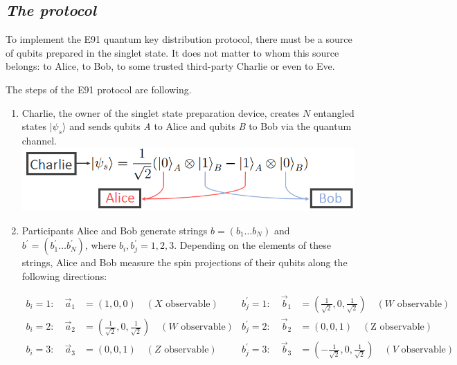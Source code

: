 \documentclass[11pt]{article}
\makeatletter
\def\maxwidth{\ifdim\Gin@nat@width>\linewidth\linewidth
    \else\Gin@nat@width\fi}
\let\Oldincludegraphics\includegraphics
\renewcommand{\includegraphics}[1]{\Oldincludegraphics[width=.8\maxwidth]{#1}}
\makeatother
\begin{document}
    \subsection{\texorpdfstring{\emph{The
protocol}}{The protocol}}\label{the-protocol}

To implement the E91 quantum key distribution protocol, there must be a
source of qubits prepared in the singlet state. It does not matter to
whom this source belongs: to Alice, to Bob, to some trusted third-party
Charlie or even to Eve.

The steps of the E91 protocol are following.

    \begin{enumerate}
\def\labelenumi{\arabic{enumi}.}
\item
  Charlie, the owner of the singlet state preparation device, creates
  \(N\) entangled states \(\lvert\psi_s\rangle\) and sends qubits
  \emph{A} to Alice and qubits \emph{B} to Bob via the quantum channel.
  \includegraphics{images/singlet_distribution.png}
\item
  Participants Alice and Bob generate strings \(b=(b_1 \ldots b_N)\) and
  \(b^{'}=(b_1^{'} \ldots b_N^{'})\), where \(b_i, b^{'}_j = 1, 2, 3\).
  Depending on the elements of these strings, Alice and Bob measure the
  spin projections of their qubits along the following directions:

  \begin{align*}
   b_i = 1: \quad \vec{a}_1 &= (1,0,0) \quad (X \text{ observable}) &
   b_j^{'} = 1: \quad \vec{b}_1 &= \left(\frac{1}{\sqrt{2}},0,\frac{1}{\sqrt{2}}\right) \quad (W \text{ observable})
   \\
   b_i = 2: \quad \vec{a}_2 &= \left(\frac{1}{\sqrt{2}},0,\frac{1}{\sqrt{2}}\right) \quad (W \text{ observable}) &
   b_j^{'} = 2: \quad \vec{b}_2 &= (0,0,1) \quad ( \text{Z observable})
   \\
   b_i = 3: \quad \vec{a}_3 &= (0,0,1) \quad (Z \text{ observable}) &
   b_j^{'} = 3: \quad \vec{b}_3 &= \left(-\frac{1}{\sqrt{2}},0,\frac{1}{\sqrt{2}}\right) \quad (V \text{ observable})
  \end{align*}


\end{enumerate}
\end{document}
